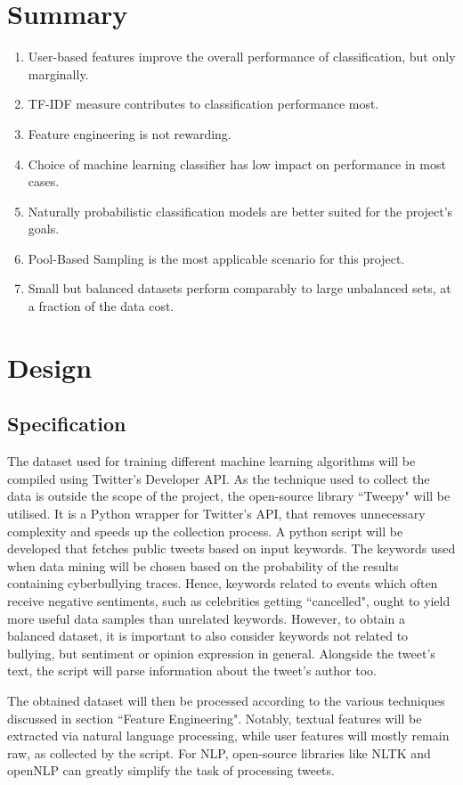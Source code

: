 \documentclass[a4paper,12pt]{article}
\begin{document}
\section{Summary}
\begin{enumerate}
  \item User-based features improve the overall performance of classification, but only marginally.
  \item TF-IDF measure contributes to classification performance most.
  \item Feature engineering is not rewarding.
  \item Choice of machine learning classifier has low impact on performance in most cases.
  \item Naturally probabilistic classification models are better suited for the project's goals.
  \item Pool-Based Sampling is the most applicable scenario for this project.
  \item Small but balanced datasets perform comparably to large unbalanced sets, at a fraction of the data cost.
\end{enumerate}
\section{Design}
\subsection{Specification}
The dataset used for training different machine learning algorithms will be compiled using Twitter's Developer API. As the technique used to collect the data is outside the scope of the project, the open-source library ``Tweepy" will be utilised. It is a Python wrapper for Twitter's API, that removes unnecessary complexity and speeds up the collection process.
A python script will be developed that fetches public tweets based on input keywords. The keywords used when data mining will be chosen based on the probability of the results containing cyberbullying traces. Hence, keywords related to events which often receive negative sentiments, such as celebrities getting ``cancelled", ought to yield more useful data samples than unrelated keywords. However, to obtain a balanced dataset, it is important to also consider keywords not related to bullying, but sentiment or opinion expression in general.
Alongside the tweet's text, the script will parse information about the tweet's author too.

The obtained dataset will then be processed according to the various techniques discussed in section ``Feature Engineering". Notably, textual features will be extracted via natural language processing, while user features will mostly remain raw, as collected by the script. For NLP, open-source libraries like NLTK and openNLP can greatly simplify the task of processing tweets.
\end{document}

